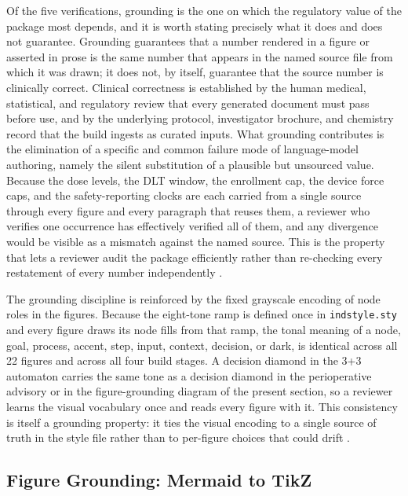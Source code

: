 Of the five verifications, grounding is the one on which the regulatory value of
the package most depends, and it is worth stating precisely what it does and does
not guarantee. Grounding guarantees that a number rendered in a figure or asserted
in prose is the same number that appears in the named source file from which it was
drawn; it does not, by itself, guarantee that the source number is clinically
correct. Clinical correctness is established by the human medical, statistical, and
regulatory review that every generated document must pass before use, and by the
underlying protocol, investigator brochure, and chemistry record that the build
ingests as curated inputs. What grounding contributes is the elimination of a
specific and common failure mode of language-model authoring, namely the silent
substitution of a plausible but unsourced value. Because the dose levels, the DLT
window, the enrollment cap, the device force caps, and the safety-reporting clocks
are each carried from a single source through every figure and every paragraph that
reuses them, a reviewer who verifies one occurrence has effectively verified all of
them, and any divergence would be visible as a mismatch against the named source.
This is the property that lets a reviewer audit the package efficiently rather than
re-checking every restatement of every number independently
\cite{oncotrialllm, llmcomp16fda}.

The grounding discipline is reinforced by the fixed grayscale encoding of node
roles in the figures. Because the eight-tone ramp is defined once in
\texttt{indstyle.sty} and every figure draws its node fills from that ramp, the
tonal meaning of a node, goal, process, accent, step, input, context, decision, or
dark, is identical across all 22 figures and across all four build stages. A
decision diamond in the 3+3 automaton carries the same tone as a decision diamond
in the perioperative advisory or in the figure-grounding diagram of the present
section, so a reviewer learns the visual vocabulary once and reads every figure
with it. This consistency is itself a grounding property: it ties the visual
encoding to a single source of truth in the style file rather than to per-figure
choices that could drift \cite{fdadigtwinpc}.

\subsection{Figure Grounding: Mermaid to TikZ}

